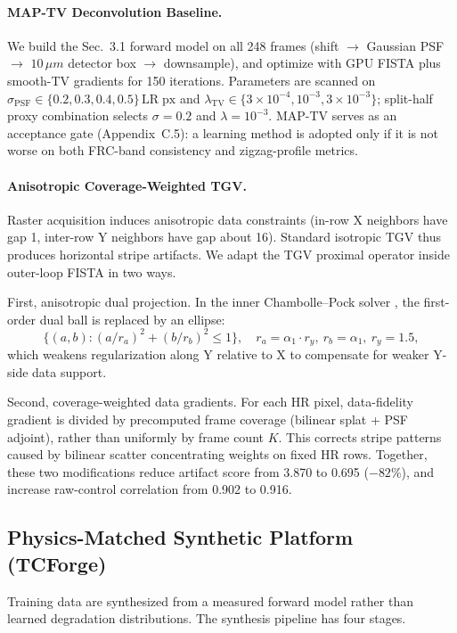 \paragraph{MAP-TV Deconvolution Baseline.}
We build the Sec.~3.1 forward model on all 248 frames (shift $\to$ Gaussian PSF $\to$ $10\,\ensuremath{\mu m}$ detector box $\to$ downsample), and optimize with GPU FISTA \citep{beck2009fast} plus smooth-TV gradients for 150 iterations. Parameters are scanned on $\sigma_{\mathrm{PSF}}\in\{0.2,0.3,0.4,0.5\}\,\mathrm{LR\;px}$ and $\lambda_{\mathrm{TV}}\in\{3\times10^{-4},10^{-3},3\times10^{-3}\}$; split-half proxy combination selects $\sigma=0.2$ and $\lambda=10^{-3}$. MAP-TV serves as an acceptance gate (Appendix~C.5): a learning method is adopted only if it is not worse on both FRC-band consistency and zigzag-profile metrics.

\paragraph{Anisotropic Coverage-Weighted TGV.}
Raster acquisition induces anisotropic data constraints (in-row X neighbors have gap 1, inter-row Y neighbors have gap about 16). Standard isotropic TGV \citep{bredies2010tgv} thus produces horizontal stripe artifacts. We adapt the TGV proximal operator inside outer-loop FISTA in two ways.

First, anisotropic dual projection. In the inner Chambolle--Pock solver \citep{chambolle2011firstorder}, the first-order dual ball is replaced by an ellipse:
\[
\{(a,b):(a/r_a)^2+(b/r_b)^2\le1\},\quad r_a=\alpha_1\cdot r_y,\ r_b=\alpha_1,\ r_y=1.5,
\]
which weakens regularization along Y relative to X to compensate for weaker Y-side data support.

Second, coverage-weighted data gradients. For each HR pixel, data-fidelity gradient is divided by precomputed frame coverage (bilinear splat + PSF adjoint), rather than uniformly by frame count $K$. This corrects stripe patterns caused by bilinear scatter concentrating weights on fixed HR rows. Together, these two modifications reduce artifact score from 3.870 to 0.695 ($-82\%$), and increase raw-control correlation from 0.902 to 0.916.

\subsection{Physics-Matched Synthetic Platform (TCForge)}

Training data are synthesized from a measured forward model rather than learned degradation distributions. The synthesis pipeline has four stages.

